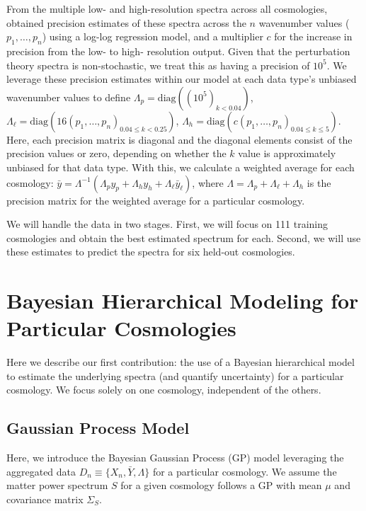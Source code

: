 \documentclass[11pt]{article}
\begin{document}
From the multiple low- and high-resolution spectra across all cosmologies, 
\cite{moran2023mira} obtained precision estimates of these spectra across the $n$ 
wavenumber values ($p_1,\dots,p_n$) using a log-log regression model, and a multiplier 
$c$ for the increase in precision from the low- to high- resolution output. Given 
that the perturbation theory spectra is non-stochastic, we treat this as having a 
precision of $10^5$. We leverage these precision estimates within our model at each 
data type's unbiased wavenumber values to define 
$\Lambda_p = \text{diag}\left((10^5)_{k < 0.04}\right)$, 
$\Lambda_{\ell} = \text{diag}\left(16(p_1,\dots,p_n)_{0.04 \leq k < 0.25}\right)$, 
$\Lambda_h = \text{diag}\left(c(p_1,\dots,p_n)_{0.04 \leq k \leq 5}\right)$. 
Here, each precision matrix is diagonal and the diagonal elements consist of the 
precision values or zero, depending on whether the $k$ value is approximately unbiased 
for that data type. With this, we calculate a weighted average for each cosmology: 
$\bar y = \Lambda^{-1}(\Lambda_p y_p + \Lambda_h y_h + \Lambda_{\ell} \bar{y}_\ell)$, 
where $\Lambda = \Lambda_p + \Lambda_\ell + \Lambda_h$ is the precision matrix for 
the weighted average for a particular cosmology.

We will handle the data in two stages.  First, we will focus on 111 training cosmologies 
and obtain the best estimated spectrum for each.  Second, we will use these estimates 
to predict the spectra for six held-out cosmologies.

\section{Bayesian Hierarchical Modeling for Particular Cosmologies}
\label{sec:hm_fit}

Here we describe our first contribution: the use of a Bayesian hierarchical model 
to estimate the underlying spectra (and quantify uncertainty) for a particular cosmology.  
We focus solely on one cosmology, independent of the others.

\subsection{Gaussian Process Model}

Here, we introduce the Bayesian Gaussian Process (GP) model leveraging the aggregated 
data $D_n \equiv \{X_n, \bar Y, \Lambda\}$ for a particular cosmology. We assume 
the matter power spectrum $S$ for a given cosmology follows a GP with mean $\mu$ 
and covariance matrix $\Sigma_S$.
\end{document}
